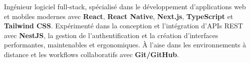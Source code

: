 \begin{cvparagraph}

  Ingénieur logiciel full-stack, spécialisé dans le développement d’applications web et mobiles modernes avec \textbf{React}, \textbf{React Native}, \textbf{Next.js}, \textbf{TypeScript} et \textbf{Tailwind CSS}. Expérimenté dans la conception et l’intégration d’APIs REST avec \textbf{NestJS}, la gestion de l’authentification et la création d’interfaces performantes, maintenables et ergonomiques. À l’aise dans les environnements à distance et les workflows collaboratifs avec \textbf{Git/GitHub}.

\end{cvparagraph}
